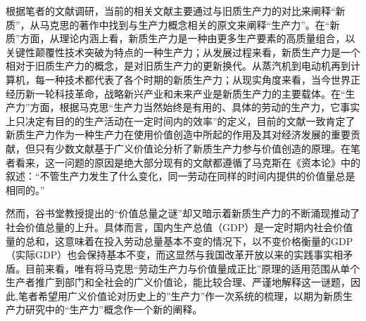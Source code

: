 根据笔者的文献调研，当前的相关文献主要通过与旧质生产力的对比来阐释“新质”，从马克思的著作中找到与生产力概念相关的原文来阐释“生产力”。在“新质”方面，从理论内涵上看，新质生产力是一种由更多生产要素的高质量组合，以关键性颠覆性技术突破为特点的一种生产力\cite[141-142]{GaoFanXinZhiShengChanLiDeTiChuLuoJiDuoWeiNeiHanJiShiDaiYiYi2023}\cite[1-2]{ZhouWenLunXinZhiShengChanLiNeiHanTeZhengYuChongYaoZhaoLiDian2023}；从发展过程来看，新质生产力是一个相对于旧质生产力的概念，是对旧质生产力的更新换代。从蒸汽机到电动机再到计算机，每一种技术都代表了各个时期的新质生产力\cite[28]{CaiJiMingXinZhiShengChanLiDeFaZhanDuiJieZhiChuangZaoHeJingJiZengChangDeGongXian2024}；从现实角度来看，当今世界正经历新一轮科技革命\cite[06]{XiJinPingJiaKuaiJianSheKeJiQiangGuoShiXianGaoShuiPingKeJiZiLiZiQiang2022}，战略新兴产业和未来产业是新质生产力的主要载体\cite[9]{XiJinPingJingJiSiXiangYanJiuZhongXinXinZhiShengChanLiDeNeiHanTeZhengHeFaZhanChongDian2024}。在“生产力”方面，根据马克思“生产力当然始终是有用的、具体的劳动的生产力，它事实上只决定有目的的生产活动在一定时间内的效率”\cite[59]{ZhongGongZhongYangMaKeSiEnGeSiLieNingSiDaLinZhuZuoBianYiJuMaKeSiEnGeSiWenJiDi5Juan2009}的定义，目前的文献一致肯定了新质生产力作为一种生产力在使用价值创造中所起的作用及其对经济发展的重要贡献\cite[16]{CaiJiMingXinZhiShengChanLiCanYuJieZhiChuangZaoDeLiLunTanTaoHeShiJianYingYong2024}\cite{YangYuZhenXinZhiShengChanLiLiLunDuiMaKeSiShengChanLiShengChanGuanXiLiLunDeShouZhengHeChuangXin2025}\cite{XieFuShengMaKeSiDeShengChanLiLiLunYuFaZhanXinZhiShengChanLi2024}\cite{HuYingZaiLunXinZhiShengChanLiDeNeiHanTeZhengYuXingChengLuJingYiMaKeSiShengChanLiLiLunWeiShiJiao2024}，但只有少数文献基于广义价值论分析了新质生产力参与价值创造的原理\cite{CaiJiMingXinZhiShengChanLiDeFaZhanDuiJieZhiChuangZaoHeJingJiZengChangDeGongXian2024}\cite{CaiJiMingXinZhiShengChanLiCanYuJieZhiChuangZaoDeLiLunTanTaoHeShiJianYingYong2024}。在笔者看来，这一问题的原因是绝大部分现有的文献都遵循了马克斯在《资本论》中的叙述：“不管生产力发生了什么变化，同一劳动在同样的时间内提供的价值量总是相同的。”\cite[60]{ZhongGongZhongYangMaKeSiEnGeSiLieNingSiDaLinZhuZuoBianYiJuMaKeSiEnGeSiWenJiDi5Juan2009}

然而，谷书堂教授提出的“价值总量之谜”\cite[6-7]{GuShuTangQiuJieJieZhiZongLiangZhiMiLiangTiaoSiLuDeBiJiao2002}却又暗示着新质生产力的不断涌现推动了社会价值总量的上升。具体而言，国内生产总值（GDP）是一定时期内社会价值量的总和\cite[107]{ChenDeDiGuoFangJingJiDaCiDian2001}，这意味着在投入劳动总量基本不变的情况下，以不变价格衡量的GDP（实际GDP）也会保持基本不变，而这显然与我国改革开放以来的实践事实相矛盾。目前来看，唯有将马克思“劳动生产力与价值量成正比”原理的适用范围从单个生产者推广到部门和全社会的广义价值论，能比较合理、严谨地解释这一谜题\cite{CaiJiMingJiShuJinBuJingJiZengChangYuJieZhiZongLiangZhiMiJiYuGuangYiJieZhiLunDeJieShi2019}，因此,笔者希望用广义价值论对历史上的”生产力”作一次系统的梳理，以期为新质生产力研究中的“生产力”概念作一个新的阐释。

